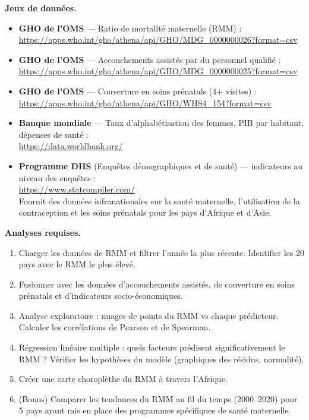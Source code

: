 \textbf{Jeux de donn\'ees.}
\begin{itemize}
  \item \textbf{GHO de l'OMS} --- Ratio de mortalit\'e maternelle (RMM) :\\
  \url{https://apps.who.int/gho/athena/api/GHO/MDG_0000000026?format=csv}
  \item \textbf{GHO de l'OMS} --- Accouchements assist\'es par du personnel qualifi\'e :\\
  \url{https://apps.who.int/gho/athena/api/GHO/MDG_0000000025?format=csv}
  \item \textbf{GHO de l'OMS} --- Couverture en soins pr\'enatals (4+ visites) :\\
  \url{https://apps.who.int/gho/athena/api/GHO/WHS4_154?format=csv}
  \item \textbf{Banque mondiale} --- Taux d'alphab\'etisation des femmes, PIB par habitant, d\'epenses de sant\'e :\\
  \url{https://data.worldbank.org/}
  \item \textbf{Programme DHS} (Enqu\^etes d\'emographiques et de sant\'e) --- indicateurs au niveau des enqu\^etes :\\
  \url{https://www.statcompiler.com/}\\
  Fournit des donn\'ees infranationales sur la sant\'e maternelle, l'utilisation de la contraception et les soins pr\'enatals pour les pays d'Afrique et d'Asie.
\end{itemize}

\textbf{Analyses requises.}
\begin{enumerate}
  \item Charger les donn\'ees de RMM et filtrer l'ann\'ee la plus r\'ecente. Identifier les 20 pays avec le RMM le plus \'elev\'e.
  \item Fusionner avec les donn\'ees d'accouchements assist\'es, de couverture en soins pr\'enatals et d'indicateurs socio-\'economiques.
  \item Analyse exploratoire : nuages de points du RMM vs chaque pr\'edicteur. Calculer les corr\'elations de Pearson et de Spearman.
  \item R\'egression lin\'eaire multiple : quels facteurs pr\'edisent significativement le RMM ? V\'erifier les hypoth\`eses du mod\`ele (graphiques des r\'esidus, normalit\'e).
  \item Cr\'eer une carte choropl\`ethe du RMM \`a travers l'Afrique.
  \item (Bonus) Comparer les tendances du RMM au fil du temps (2000--2020) pour 5 pays ayant mis en place des programmes sp\'ecifiques de sant\'e maternelle.
\end{enumerate}

